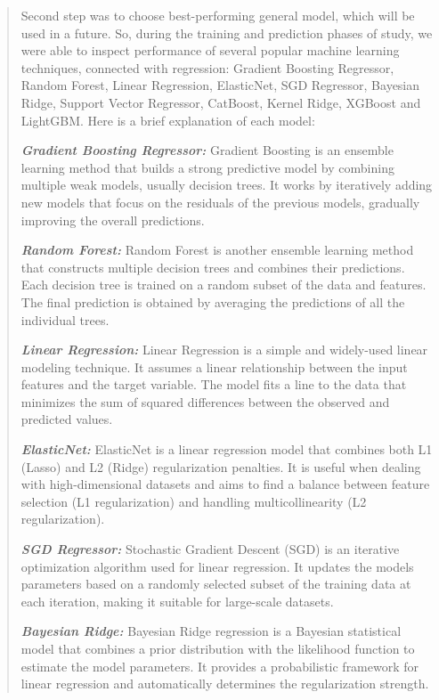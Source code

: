 \begin{quote}
Second step was to choose best-performing general model, which will be
used in a future. So, during the training and prediction phases of
study, we were able to inspect performance of several popular machine
learning techniques, connected with regression: Gradient Boosting
Regressor, Random Forest, Linear Regression, ElasticNet, SGD Regressor,
Bayesian Ridge, Support Vector Regressor, CatBoost, Kernel Ridge,
XGBoost and LightGBM. Here is a brief explanation of each model:

\emph{{\bfseries Gradient Boosting Regressor:}} Gradient Boosting is an
ensemble learning method that builds a strong predictive model by
combining multiple weak models, usually decision trees. It works by
iteratively adding new models that focus on the residuals of the
previous models, gradually improving the overall predictions.

\emph{{\bfseries Random Forest:}} Random Forest is another ensemble
learning method that constructs multiple decision trees and combines
their predictions. Each decision tree is trained on a random subset of
the data and features. The final prediction is obtained by averaging the
predictions of all the individual trees.

\emph{{\bfseries Linear Regression:}} Linear Regression is a simple and
widely-used linear modeling technique. It assumes a linear relationship
between the input features and the target variable. The model fits a
line to the data that minimizes the sum of squared differences between
the observed and predicted values.

\emph{{\bfseries ElasticNet:}} ElasticNet is a linear regression model that
combines both L1 (Lasso) and L2 (Ridge) regularization penalties. It is
useful when dealing with high-dimensional datasets and aims to find a
balance between feature selection (L1 regularization) and handling
multicollinearity (L2 regularization).

\emph{{\bfseries SGD Regressor:}} Stochastic Gradient Descent (SGD) is an
iterative optimization algorithm used for linear regression. It updates
the model\textquotesingle s parameters based on a randomly selected
subset of the training data at each iteration, making it suitable for
large-scale datasets.

\emph{{\bfseries Bayesian Ridge:}} Bayesian Ridge regression is a Bayesian
statistical model that combines a prior distribution with the likelihood
function to estimate the model parameters. It provides a probabilistic
framework for linear regression and automatically determines the
regularization strength.


\end{quote}
